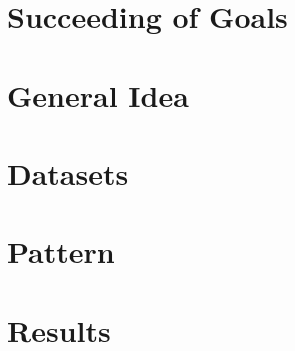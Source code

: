 \label{chapter:evaluation}

\section{Succeeding of Goals}

\section{General Idea}

\section{Datasets}

\section{Pattern}

\section{Results}
